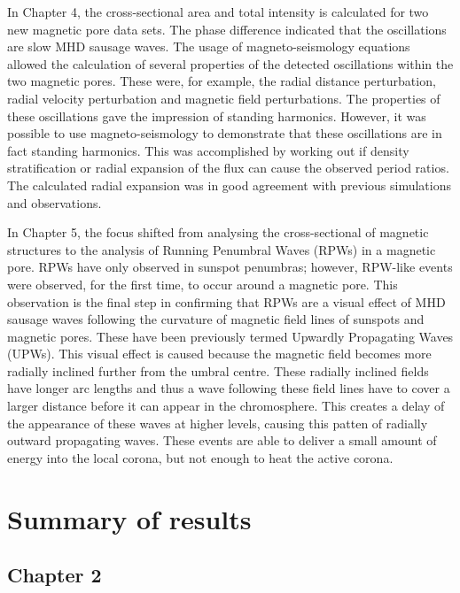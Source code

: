    In Chapter 4, the cross-sectional area and total intensity is calculated for two new magnetic pore data sets.
    The phase difference indicated that the oscillations are slow MHD sausage waves.
    The usage of magneto-seismology equations allowed the calculation of several properties of the detected oscillations within the two magnetic pores.
    These were, for example, the radial distance perturbation, radial velocity perturbation and magnetic field perturbations.
    The properties of these oscillations gave the impression of standing harmonics.
    However, it was possible to use magneto-seismology to demonstrate that these oscillations are in fact standing harmonics.
    This was accomplished by working out if density stratification or radial expansion of the flux can cause the observed period ratios.
    The calculated radial expansion was in good agreement with previous simulations and observations. 
    
    In Chapter 5, the focus shifted from analysing the cross-sectional of magnetic structures to the analysis of Running Penumbral Waves (RPWs) in a magnetic pore.
    RPWs have only observed in sunspot penumbras; however, RPW-like events were observed, for the first time, to occur around a magnetic pore.
    This observation is the final step in confirming that RPWs are a visual effect of MHD sausage waves following the curvature of magnetic field lines of sunspots and magnetic pores.
    These have been previously termed Upwardly Propagating Waves (UPWs).
    This visual effect is caused because the magnetic field becomes more radially inclined further from the umbral centre.
    These radially inclined fields have longer arc lengths and thus a wave following these field lines have to cover a larger distance before it can appear in the chromosphere.
    This creates a delay of the appearance of these waves at higher levels, causing this patten of radially outward propagating waves.
    These events are able to deliver a small amount of energy into the local corona, but not enough to heat the active corona.
       
\section{Summary of results}

	\subsection{Chapter 2}


